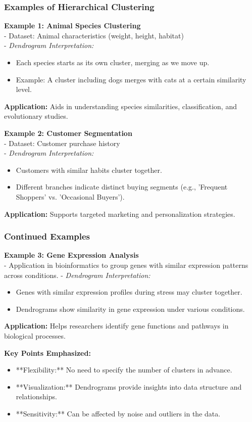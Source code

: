 \documentclass[aspectratio=169]{beamer}
\begin{document}
\begin{frame}[fragile]
    \frametitle{Examples of Hierarchical Clustering}
    \textbf{Example 1: Animal Species Clustering}\\
    - Dataset: Animal characteristics (weight, height, habitat)\\
    - \textit{Dendrogram Interpretation:}
        \begin{itemize}
            \item Each species starts as its own cluster, merging as we move up.
            \item Example: A cluster including dogs merges with cats at a certain similarity level.
        \end{itemize}
    \textbf{Application:} Aids in understanding species similarities, classification, and evolutionary studies.

    \vspace{0.5cm}
    
    \textbf{Example 2: Customer Segmentation}\\
    - Dataset: Customer purchase history\\
    - \textit{Dendrogram Interpretation:}
        \begin{itemize}
            \item Customers with similar habits cluster together.
            \item Different branches indicate distinct buying segments (e.g., 'Frequent Shoppers' vs. 'Occasional Buyers').
        \end{itemize}
    \textbf{Application:} Supports targeted marketing and personalization strategies.
\end{frame}

\begin{frame}[fragile]
    \frametitle{Continued Examples}
    \textbf{Example 3: Gene Expression Analysis}\\
    - Application in bioinformatics to group genes with similar expression patterns across conditions.
    - \textit{Dendrogram Interpretation:}
        \begin{itemize}
            \item Genes with similar expression profiles during stress may cluster together.
            \item Dendrograms show similarity in gene expression under various conditions.
        \end{itemize}
    \textbf{Application:} Helps researchers identify gene functions and pathways in biological processes.
    
    \vspace{0.5cm}

    \textbf{Key Points Emphasized:}
    \begin{itemize}
        \item **Flexibility:** No need to specify the number of clusters in advance.
        \item **Visualization:** Dendrograms provide insights into data structure and relationships.
        \item **Sensitivity:** Can be affected by noise and outliers in the data.
    \end{itemize}
\end{frame}
\end{document}
